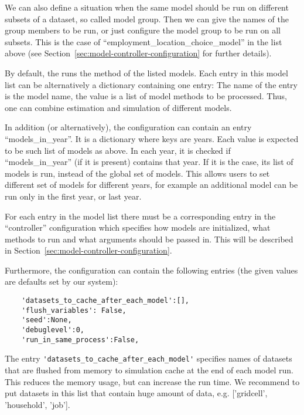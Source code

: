We can also define a situation when the same model should be run on different subsets of 
a dataset, so called model group. Then we can give the names of the group members to be run, or 
just configure the model group to be run on all subsets. This is the case of ``employment_location_choice_model''
in the list above (see Section~\ref{sec:model-controller-configuration} for further details).
 
By default, the  runs the method
 of the listed models. Each entry in this model list can be
alternatively a dictionary containing one entry: The name of the entry is the model
name, the value is a list of model methods to be processed. Thus, one can combine
estimation and simulation of different models. 

In addition (or alternatively), the configuration can contain an entry
``models_in_year''. It is a dictionary where keys are years. Each value is
expected to be such list of models as above. In each year, it is checked if
``models_in_year'' (if it is present) contains that year. If it is the case,
its list of models is run, instead of the global set of models. This allows
users to set different set of models for different years, for example an
additional model can be run only in the first year, or last year.

For each entry in the model list there must be a corresponding entry in
the ``controller'' configuration which specifies how models are initialized,
what methods to run and what arguments should be passed in. This will be
described in Section~\ref{sec:model-controller-configuration}.

Furthermore, the configuration can contain the following entries (the given
values are defaults set by our system):
\begin{verbatim}
    'datasets_to_cache_after_each_model':[],
    'flush_variables': False,
    'seed':None,
    'debuglevel':0,
    'run_in_same_process':False,
\end{verbatim}

The entry \verb|'datasets_to_cache_after_each_model'| specifies names of datasets that
are flushed from memory to simulation cache at the end of each model
run.  This reduces the memory
usage, but can increase the run time. We recommend to put datasets in this list
that contain huge amount of data, e.g.  ['gridcell', 'household', 'job'].

